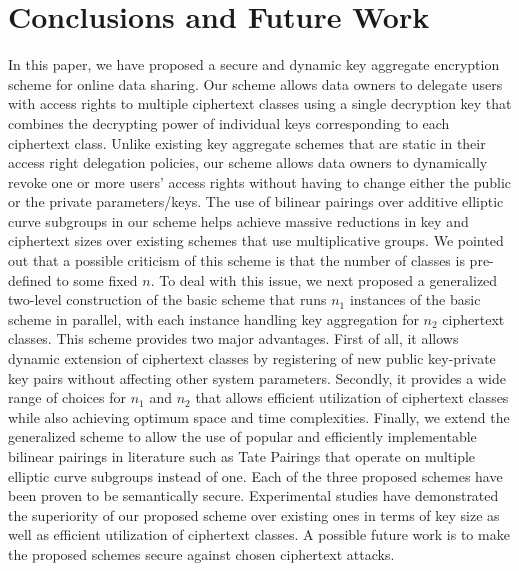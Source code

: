 \section{Conclusions and Future Work}
\label{sec:conclusions}

In this paper, we have proposed a secure and dynamic key aggregate encryption scheme for online data sharing. Our scheme allows data owners to delegate users with access rights to multiple ciphertext classes using a single decryption key that combines the decrypting power of individual keys corresponding to each ciphertext class. Unlike existing key aggregate schemes that are static in their access right delegation policies, our scheme allows data owners to dynamically revoke one or more users' access rights without having to change either the public or the private parameters/keys. The use of bilinear pairings over additive elliptic curve subgroups in our scheme helps achieve massive reductions in key and ciphertext sizes over existing schemes that use multiplicative groups. We pointed out that a possible criticism of this scheme is that the number of classes is pre-defined to some fixed $n$. To deal with this issue, we next proposed a generalized two-level construction of the basic scheme that runs $n_1$ instances of the basic scheme in parallel, with each instance handling key aggregation for $n_2$ ciphertext classes. This scheme provides two major advantages. First of all, it allows dynamic extension of ciphertext classes by registering of new public key-private key pairs without affecting other system parameters. Secondly, it provides a wide range of choices for $n_1$ and $n_2$ that allows efficient utilization of ciphertext classes while also achieving optimum space and time complexities. Finally, we extend the generalized scheme to allow the use of popular and efficiently implementable bilinear pairings in literature such as Tate Pairings that operate on multiple elliptic curve subgroups instead of one. Each of the three proposed schemes have been proven to be semantically secure. Experimental studies have demonstrated the superiority of our proposed scheme over existing ones in terms of key size as well as efficient utilization of ciphertext classes. A possible future work is to make the proposed schemes secure against chosen ciphertext attacks.